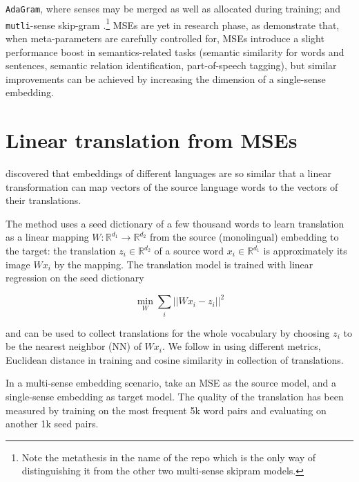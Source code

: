 \documentclass[11pt]{article}
\newcommand{\adagram}{\texttt{AdaGram}}
\newcommand{\mutli}{\texttt{mutli}}
\newcommand{\Ro}{\mathbb{R}^{d_1}}
\newcommand{\Rt}{\mathbb{R}^{d_2}}
\begin{document}
 \adagram \citep{Bartunov:2015}, where senses may be
merged as well as allocated during training; and \mutli-sense skip-gram
\citep{Li:2015}.\footnote{Note the metathesis in the name of the repo which is
the only way of distinguishing it from the other two multi-sense skipram
models.}  MSEs are yet in
research phase, as \cite{Li:2015}  demonstrate that, when meta-parameters are
carefully controlled for, MSEs introduce a slight performance boost in
semantics-related tasks (semantic similarity for words and sentences, semantic
relation identification, part-of-speech tagging), but similar improvements can
be achieved by increasing the dimension of a single-sense embedding.


\section{Linear translation from MSEs}

 \cite{Mikolov:2013x} discovered that embeddings of different languages are so
 similar that a linear transformation can map vectors of the source language
 words to the vectors of their translations.

The method uses a seed dictionary of a few thousand words to learn translation
as a linear mapping $W: \mathbb{R}^{d_1}\rightarrow \mathbb{R}^{d_2}$ from the
source (monolingual) embedding to the target: the translation $z_i \in \Rt$ of
a source word $x_i \in \Ro$ is approximately its image $Wx_i$ by the mapping.
The translation model is trained with linear regression on the seed dictionary

\[\min_W \sum_i || Wx_i - z_i ||^2 \]

\noindent and can be used to collect translations for the whole vocabulary by
choosing $z_i$ to be the nearest neighbor (NN) of $Wx_i$.
We follow \cite{Mikolov:2013x} in using different metrics, Euclidean
 distance in training and cosine similarity in collection of translations.

In a multi-sense embedding scenario, \cite{Borbely:2016} take an MSE as the
source model, and a single-sense embedding as target model.  The quality of the
translation has been measured by training on the most frequent 5k word pairs
and evaluating on another 1k seed pairs.
\end{document}
